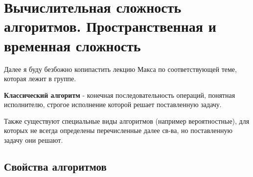 \section{Вычислительная сложность алгоритмов. Пространственная и временная сложность}
\begin{notice}
    Далее я буду безбожно копипастить лекцию Макса по соответствующей теме, которая лежит в группе.
\end{notice}
\begin{definition}
    \textbf{Классический алгоритм} - конечная последовательность операций, понятная исполнителю, строгое исполнение которой решает поставленную задачу.
\end{definition}
\begin{notice}
    Также существуют специальные виды алгоритмов (например вероятностные), для которых не всегда определены перечисленные далее св-ва, но поставленную задачу они решают.
\end{notice}

\subsection{Свойства алгоритмов}

